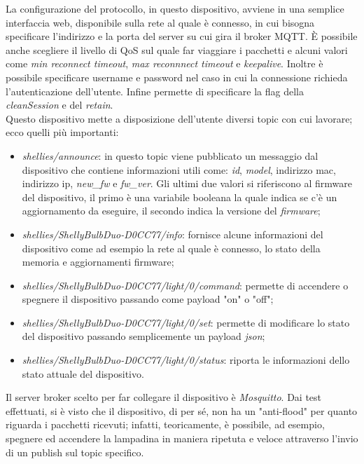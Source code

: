 \documentclass[binding=0.6cm,TFA]{sapthesis}
\begin{document}
\begin{large}
La configurazione del protocollo, in questo dispositivo, avviene in una semplice interfaccia web, disponibile sulla rete al quale è connesso, in cui bisogna specificare l'indirizzo e la porta del server su cui gira il broker MQTT. È possibile anche scegliere il livello di QoS sul quale far viaggiare i pacchetti e alcuni valori come \textit{min reconnect timeout}, \textit{max reconnnect timeout} e \textit{keepalive}. Inoltre è possibile specificare username e password nel caso in cui la connessione richieda l'autenticazione dell'utente. Infine permette di specificare la flag della \textit{cleanSession} e del \textit{retain}. \\

\newcommand{\deviceshelly}{D0CC77}
Questo dispositivo mette a disposizione dell'utente diversi topic con cui lavorare; ecco quelli più importanti:

\begin{itemize}
\item \textit{shellies/announce}: in questo topic viene pubblicato un messaggio dal dispositivo che contiene informazioni utili come: \textit{id}, \textit{model}, indirizzo mac, indirizzo ip, \textit{new\_fw} e \textit{fw\_ver}. Gli ultimi due valori si riferiscono al firmware del dispositivo, il primo è una variabile booleana la quale indica se c'è un aggiornamento da eseguire, il secondo indica la versione del \textit{firmware};
\item \textit{shellies/ShellyBulbDuo-\deviceshelly/info}: fornisce alcune informazioni del dispositivo come ad esempio la rete al quale è connesso, lo stato della memoria e aggiornamenti firmware;
\item \textit{shellies/ShellyBulbDuo-\deviceshelly/light/0/command}: permette di accendere o spegnere il dispositivo passando come payload "on" o "off";
\item \textit{shellies/ShellyBulbDuo-\deviceshelly/light/0/set}: permette di modificare lo stato del dispositivo passando semplicemente un payload \textit{json};
\item \textit{shellies/ShellyBulbDuo-\deviceshelly/light/0/status}: riporta le informazioni dello stato attuale del dispositivo.
\end{itemize}

Il server broker scelto per far collegare il dispositivo è \textit{Mosquitto}. Dai test effettuati, si è visto che il dispositivo, di per sé, non ha un "anti-flood" per quanto riguarda i pacchetti ricevuti; infatti, teoricamente, è possibile, ad esempio, spegnere ed accendere la lampadina in maniera ripetuta e veloce attraverso l'invio di un publish sul topic specifico. \\


\end{large}
\end{document}
